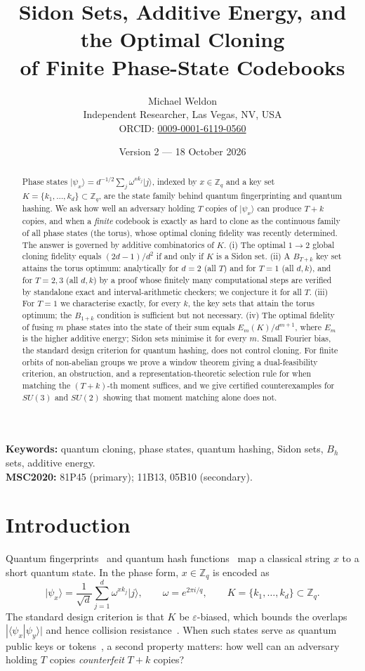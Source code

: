 \documentclass[11pt]{article}
\title{Sidon Sets, Additive Energy, and the Optimal Cloning\\ of Finite Phase-State Codebooks}
\author{Michael Weldon\\[2pt]
\small Independent Researcher, Las Vegas, NV, USA\\
\small ORCID: \href{https://orcid.org/0009-0001-6119-0560}{0009-0001-6119-0560}}
\date{Version 2 --- 18 October 2026}
\newcommand{\Z}{\mathbb{Z}}
\newcommand{\ket}[1]{\lvert #1\rangle}
\theoremstyle{definition}
\theoremstyle{remark}
\begin{document}
\maketitle

\begin{abstract}
Phase states $\ket{\psi_x}=d^{-1/2}\sum_{j}\omega^{x k_j}\ket{j}$, indexed by $x\in\Z_q$ and a key set
$K=\{k_1,\dots,k_d\}\subset\Z_q$, are the state family behind quantum fingerprinting and quantum hashing.
We ask how well an adversary holding $T$ copies of $\ket{\psi_x}$ can produce $T+k$ copies, and when a
\emph{finite} codebook is exactly as hard to clone as the continuous family of all phase states (the torus),
whose optimal cloning fidelity was recently determined. The answer is governed by additive combinatorics of $K$.
(i) The optimal $1\to2$ global cloning fidelity equals $(2d-1)/d^2$ if and only if $K$ is a Sidon set.
(ii) A $B_{T+k}$ key set attains the torus optimum: analytically for $d=2$ (all $T$) and for $T=1$ (all $d,k$), and for
$T=2,3$ (all $d,k$) by a proof whose finitely many computational steps are verified by standalone exact and
interval-arithmetic checkers; we conjecture it for all $T$. (iii) For $T=1$ we characterise exactly, for every $k$, the key
sets that attain the torus optimum; the $B_{1+k}$ condition is sufficient but not necessary. (iv) The optimal fidelity of
fusing $m$ phase states into the state of their sum equals $E_m(K)/d^{m+1}$, where $E_m$ is the higher additive energy;
Sidon sets minimise it for every $m$. Small Fourier bias, the standard design criterion for quantum hashing, does not
control cloning. For finite orbits of non-abelian groups we prove a window theorem giving a dual-feasibility criterion, an
obstruction, and a representation-theoretic selection rule for when matching the $(T+k)$-th moment suffices, and we give
certified counterexamples for $SU(3)$ and $SU(2)$ showing that moment matching alone does not.
\end{abstract}
\noindent\textbf{Keywords:} quantum cloning, phase states, quantum hashing, Sidon sets, $B_h$ sets, additive energy.\\
\textbf{MSC2020:} 81P45 (primary); 11B13, 05B10 (secondary).

\section{Introduction}
Quantum fingerprints~\cite{Buhrman2001} and quantum hash functions~\cite{AblayevVasiliev2014,Vasiliev2016,Ziiatdinov2016,Ablayev2025}
map a classical string $x$ to a short quantum state. In the phase form, $x\in\Z_q$ is encoded as
\begin{equation}\label{eq:phase}
\ket{\psi_x}=\frac{1}{\sqrt d}\sum_{j=1}^{d}\omega^{x k_j}\ket{j},\qquad \omega=e^{2\pi i/q},\qquad K=\{k_1,\dots,k_d\}\subset\Z_q .
\end{equation}
The standard design criterion is that $K$ be $\varepsilon$-biased, which bounds the overlaps
$|\langle\psi_x|\psi_y\rangle|$ and hence collision resistance~\cite{Vasiliev2016,Ablayev2025}.
When such states serve as quantum public keys or tokens~\cite{GottesmanChuang2001}, a second property matters:
how well can an adversary holding $T$ copies \emph{counterfeit} $T+k$ copies?
\end{document}
